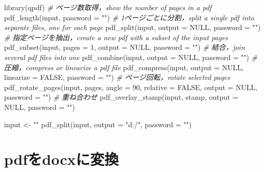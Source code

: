 \documentclass[
]{article}
\newenvironment{Shaded}{\begin{snugshade}}{\end{snugshade}}
\newcommand{\AttributeTok}[1]{\textcolor[rgb]{0.77,0.63,0.00}{#1}}
\newcommand{\CommentTok}[1]{\textcolor[rgb]{0.56,0.35,0.01}{\textit{#1}}}
\newcommand{\ConstantTok}[1]{\textcolor[rgb]{0.00,0.00,0.00}{#1}}
\newcommand{\DecValTok}[1]{\textcolor[rgb]{0.00,0.00,0.81}{#1}}
\newcommand{\FunctionTok}[1]{\textcolor[rgb]{0.00,0.00,0.00}{#1}}
\newcommand{\NormalTok}[1]{#1}
\newcommand{\OtherTok}[1]{\textcolor[rgb]{0.56,0.35,0.01}{#1}}
\newcommand{\StringTok}[1]{\textcolor[rgb]{0.31,0.60,0.02}{#1}}
\begin{document}
\begin{Shaded}
\begin{Highlighting}[]
\FunctionTok{library}\NormalTok{(qpdf)}
  \CommentTok{\# ページ数取得，show the number of pages in a pdf}
\FunctionTok{pdf\_length}\NormalTok{(input, }\AttributeTok{password =} \StringTok{""}\NormalTok{)}
  \CommentTok{\# 1ページごとに分割，split a single pdf into separate files, one for each page}
\FunctionTok{pdf\_split}\NormalTok{(input, }\AttributeTok{output =} \ConstantTok{NULL}\NormalTok{, }\AttributeTok{password =} \StringTok{""}\NormalTok{)}
  \CommentTok{\# 指定ページを抽出，create a new pdf with a subset of the input pages}
\FunctionTok{pdf\_subset}\NormalTok{(input, }\AttributeTok{pages =} \DecValTok{1}\NormalTok{, }\AttributeTok{output =} \ConstantTok{NULL}\NormalTok{, }\AttributeTok{password =} \StringTok{""}\NormalTok{)}
  \CommentTok{\# 結合，join several pdf files into one}
\FunctionTok{pdf\_combine}\NormalTok{(input, }\AttributeTok{output =} \ConstantTok{NULL}\NormalTok{, }\AttributeTok{password =} \StringTok{""}\NormalTok{)}
  \CommentTok{\# 圧縮，compress or linearize a pdf file}
\FunctionTok{pdf\_compress}\NormalTok{(input, }\AttributeTok{output =} \ConstantTok{NULL}\NormalTok{, }\AttributeTok{linearize =} \ConstantTok{FALSE}\NormalTok{, }\AttributeTok{password =} \StringTok{""}\NormalTok{)}
  \CommentTok{\# ページ回転，rotate selected pages}
\FunctionTok{pdf\_rotate\_pages}\NormalTok{(input, pages, }\AttributeTok{angle =} \DecValTok{90}\NormalTok{, }\AttributeTok{relative =} \ConstantTok{FALSE}\NormalTok{, }\AttributeTok{output =} \ConstantTok{NULL}\NormalTok{, }\AttributeTok{password =} \StringTok{""}\NormalTok{)}
  \CommentTok{\# 重ね合わせ}
\FunctionTok{pdf\_overlay\_stamp}\NormalTok{(input, stamp, }\AttributeTok{output =} \ConstantTok{NULL}\NormalTok{, }\AttributeTok{password =} \StringTok{""}\NormalTok{)}
\end{Highlighting}
\end{Shaded}

\begin{Shaded}
\begin{Highlighting}[]
\NormalTok{input }\OtherTok{\textless{}{-}} \StringTok{""}
\FunctionTok{pdf\_split}\NormalTok{(input, }\AttributeTok{output =} \StringTok{"d:/"}\NormalTok{, }\AttributeTok{password =} \StringTok{""}\NormalTok{)}
\end{Highlighting}
\end{Shaded}

\hypertarget{pdf2docx}{%
\section{pdfをdocxに変換}\label{pdf2docx}}
\end{document}
